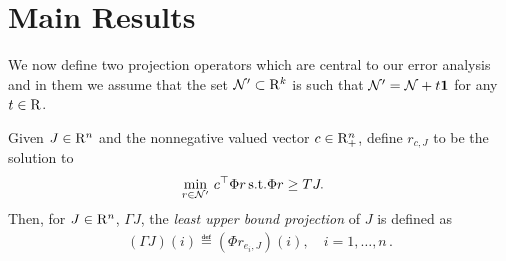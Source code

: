 \section{Main Results}
\begin{comment}
The Generalized Reduced Linear Program is given as:
\begin{align}\label{grlp}
\begin{split}
&\underset{r\in \N\subset R^k}{\min}\, \, c^\top \Phi r\,\,\,\,\\
&\text{s.t.}\mb  \,W^\top E\Phi r\geq W^\top H \Phi r,
\end{split}
\end{align}
where we assume that $W \in \R^{nd\times m}_+$ is a matrix with all positive entries, $\N$ is an additional (compact) constraint set to ensure the boundedness of the solution and $\tr \in \N$.
\footnote{The appendix explains how $\N$ can be chosen.}
In what follows, we denote the solution to the GRLP by $\hr$, the approximate value function by $\hj=\Phi \hr$ and use $\hu$ to denote the greedy policy w.r.t. $\hj$.\par
\end{comment}
We now define two projection operators which are central to our error analysis and in them we assume that the set $\mathcal{N}'\subset \mathrm{R}^k$ is such that $\mathcal{N}' = \mathcal{N} + t \mathbf{1}$ for any $t\in \mathrm{R}$.
\begin{definition}\label{lubpop}
Given $J\in \mathrm{R}^n$ and the nonnegative valued vector $c\in \mathrm{R}^n_+$, define $r_{c,J}$ to be the solution to
\begin{align}
\label{lubplp}
\begin{split}
\underset{r\in \N'}{\min} &\,\, c^\top \Phi r\,\mb
\text{s.t.} \mb \Phi r\geq  TJ.
\end{split}
\end{align}
Then, for $J\in \mathrm{R}^n$, $\Gamma J$,
the \emph{ least upper bound projection} of $J$ is defined as
\begin{align}\label{gamdef}
(\Gamma J)(i)\eqdef(\Phi r_{e_i,J})(i),\quad i=1,\ldots,n\,.
\end{align}
\end{definition}

